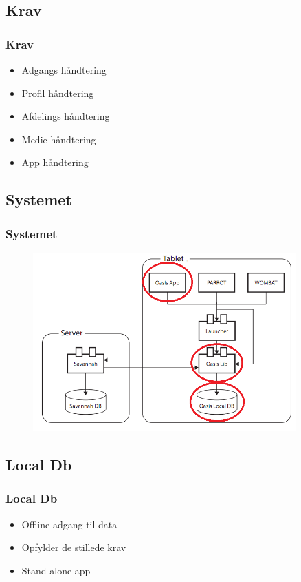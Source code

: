 \documentclass{beamer}
\begin{document}
\subsection{Krav}

\begin{frame}
	\frametitle{Krav}
	
	\begin{itemize}
		\item Adgangs h\aa{}ndtering
		\item Profil h\aa{}ndtering
		\item Afdelings h\aa{}ndtering
		\item Medie h\aa{}ndtering
		\item App h\aa{}ndtering
	\end{itemize}
\end{frame}

\subsection{Systemet}

\begin{frame}
	\frametitle{Systemet}
	\begin{figure}[!h]
		\centering
			\includegraphics[width=0.9\textwidth]{GIRAF.PNG}
		\label{fig:Giraf_comp}
	\end{figure}
\end{frame}

\subsection{Local Db}

\begin{frame}
	\frametitle{Local Db}
	
	\begin{itemize}
		\item Offline adgang til data
		\item Opfylder de stillede krav
		\item Stand-alone app
	\end{itemize}
\end{frame}
\end{document}
